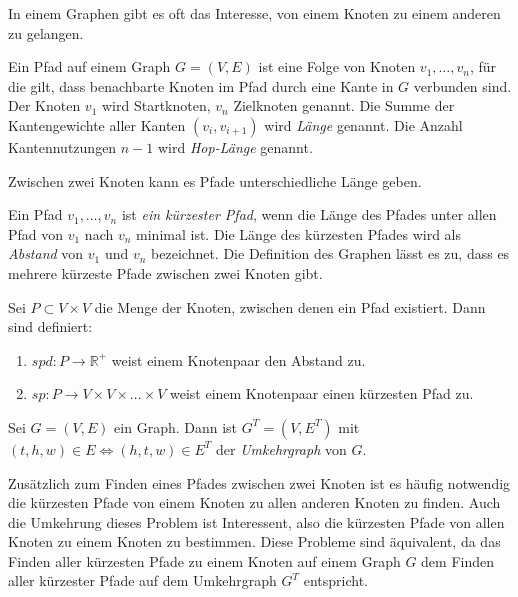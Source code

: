In einem Graphen gibt es oft das Interesse, von einem Knoten zu einem anderen zu gelangen.

\begin{definition}[Pfad]
    Ein Pfad auf einem Graph $G = (V, E)$ ist eine Folge von Knoten $v_1, \dotsc, v_n$, für die gilt, dass benachbarte Knoten im Pfad durch eine Kante in $G$ verbunden sind.
    Der Knoten $v_1$ wird Startknoten, $v_n$ Zielknoten genannt.
    Die Summe der Kantengewichte aller Kanten $(v_i, v_{i + 1})$ wird \emph{Länge} genannt.
    Die Anzahl Kantennutzungen $n - 1$ wird \emph{Hop-Länge} genannt.
\end{definition}

Zwischen zwei Knoten kann es Pfade unterschiedliche Länge geben.

\begin{definition}
    Ein Pfad $v_1, \dotsc, v_n$ ist \emph{ein kürzester Pfad}, wenn die Länge des Pfades unter allen Pfad von $v_1$ nach $v_n$ minimal ist. Die Länge des kürzesten Pfades wird als \emph{Abstand} von $v_1$ und $v_n$ bezeichnet. Die Definition des Graphen lässt es zu, dass es mehrere kürzeste Pfade zwischen zwei Knoten gibt.

    Sei $P \subset V \times V$ die Menge der Knoten, zwischen denen ein Pfad existiert. Dann sind definiert:
    \begin{enumerate}
        \item
              ${spd} \colon P \to \mathbb{R}^+$ weist einem Knotenpaar den Abstand zu.

        \item
              ${sp} \colon P \to V \times V \times \dots \times V$ weist einem Knotenpaar einen kürzesten Pfad zu.
    \end{enumerate}
\end{definition}

\begin{definition}[Umkehrgraph]
    Sei $G = (V, E)$ ein Graph. Dann ist $G^T = (V, E^T)$ mit $(t, h, w) \in E \Leftrightarrow (h, t, w) \in E^T$ der \emph{Umkehrgraph} von $G$.
\end{definition}

Zusätzlich zum Finden eines Pfades zwischen zwei Knoten ist es häufig notwendig die kürzesten Pfade von einem Knoten zu allen anderen Knoten zu finden.
Auch die Umkehrung dieses Problem ist Interessent, also die kürzesten Pfade von allen Knoten zu einem Knoten zu bestimmen.
Diese Probleme sind äquivalent, da das Finden aller kürzesten Pfade zu einem Knoten auf einem Graph $G$ dem Finden aller kürzester Pfade auf dem Umkehrgraph $G^T$ entspricht.


